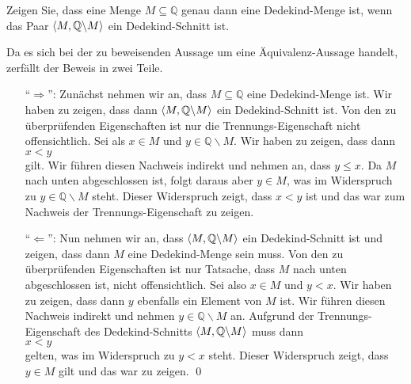 \exercise
Zeigen Sie, dass eine Menge $M \subseteq \mathbb{Q}$ genau dann eine Dedekind-Menge ist, wenn das Paar $\pair(M,\mathbb{Q} \backslash M)$
ein Dedekind-Schnitt ist. \eox

\solution
Da es sich bei der zu beweisenden Aussage um eine \"Aquivalenz-Aussage handelt,  zerf\"allt der Beweis
in zwei Teile.
\begin{enumerate}
\item[``$\Rightarrow$'':] Zun\"achst nehmen wir an, dass $M \subseteq \mathbb{Q}$ eine Dedekind-Menge ist.  Wir haben zu
      zeigen, dass dann $\pair(M,\mathbb{Q} \backslash M)$ ein Dedekind-Schnitt ist.  Von den zu
      \"uberpr\"ufenden Eigenschaften ist nur die Trennungs-Eigenschaft nicht offensichtlich.
      Sei als $x \in M$ und $y \in \mathbb{Q} \backslash M$.  Wir haben zu zeigen, dass dann
      \\[0.2cm]
      \hspace*{1.3cm}
      $x < y$
      \\[0.2cm]
      gilt.  Wir f\"uhren diesen Nachweis indirekt und nehmen an, dass $y \leq x$.  Da $M$ nach unten
      abgeschlossen ist, folgt daraus aber $y \in M$, was im Widerspruch zu $y \in \mathbb{Q} \backslash M$ steht.
      Dieser Widerspruch zeigt, dass $x < y$ ist und das war zum Nachweis der Trennungs-Eigenschaft
      zu zeigen.
\item[``$\Leftarrow$'':] Nun nehmen wir an, dass $\pair(M, \mathbb{Q} \backslash M)$ ein Dedekind-Schnitt ist und
     zeigen, dass dann $M$ eine Dedekind-Menge sein muss.  Von den zu \"uberpr\"ufenden Eigenschaften
     ist nur Tatsache, dass $M$ nach unten abgeschlossen ist, nicht offensichtlich.  Sei also $x \in M$
     und $y < x$.  Wir haben zu zeigen, dass dann $y$ ebenfalls ein Element von $M$ ist.  Wir f\"uhren
     diesen Nachweis indirekt und nehmen $y \in \mathbb{Q} \backslash M$ an.  Aufgrund der
     Trennungs-Eigenschaft des Dedekind-Schnitts $\pair(M, \mathbb{Q} \backslash M)$ muss dann
     \\[0.2cm]
     \hspace*{1.3cm}
     $x < y$
     \\[0.2cm]
     gelten, was im Widerspruch zu $y < x$ steht.  Dieser Widerspruch zeigt, dass $y \in M$ gilt
     und das war zu zeigen.  \qed
\end{enumerate}

